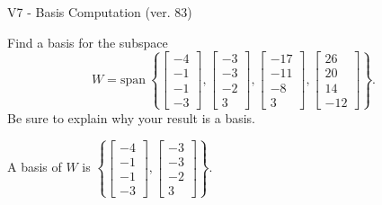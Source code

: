 \begin{exercise}
  \begin{exerciseTitle}V7 - Basis Computation (ver. 83)\end{exerciseTitle}
  \begin{exerciseStatement}
    Find a basis for the subspace 
\[W=\mathrm{span}\ \left\{\left[\begin{array}{r}
-4 \\
-1 \\
-1 \\
-3
\end{array}\right] , \left[\begin{array}{r}
-3 \\
-3 \\
-2 \\
3
\end{array}\right] , \left[\begin{array}{r}
-17 \\
-11 \\
-8 \\
3
\end{array}\right] , \left[\begin{array}{r}
26 \\
20 \\
14 \\
-12
\end{array}\right]\right\}.\]
 Be sure to explain why your result is a basis.


  \end{exerciseStatement}
  \begin{exerciseAnswer}
   A basis of \(W\) is  \(\left\{\left[\begin{array}{r}
-4 \\
-1 \\
-1 \\
-3
\end{array}\right] , \left[\begin{array}{r}
-3 \\
-3 \\
-2 \\
3
\end{array}\right]\right\}\).
  


  \end{exerciseAnswer}
\end{exercise}